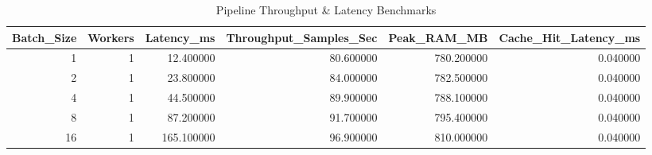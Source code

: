 \begin{table}
\caption{Pipeline Throughput & Latency Benchmarks}
\begin{tabular}{rrrrrr}
\toprule
Batch_Size & Workers & Latency_ms & Throughput_Samples_Sec & Peak_RAM_MB & Cache_Hit_Latency_ms \\
\midrule
1 & 1 & 12.400000 & 80.600000 & 780.200000 & 0.040000 \\
2 & 1 & 23.800000 & 84.000000 & 782.500000 & 0.040000 \\
4 & 1 & 44.500000 & 89.900000 & 788.100000 & 0.040000 \\
8 & 1 & 87.200000 & 91.700000 & 795.400000 & 0.040000 \\
16 & 1 & 165.100000 & 96.900000 & 810.000000 & 0.040000 \\
\bottomrule
\end{tabular}
\end{table}
